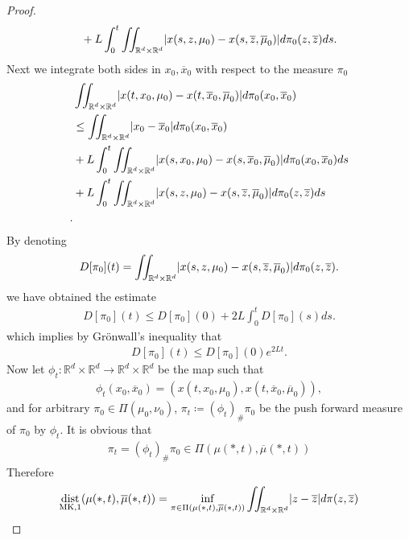\begin{proof}
\begin{alignat*}{3}
  &  &&+L \int_0^{t} \iint_{\mathbb{R}^{d} \times  \mathbb{R}^{d}  }  \lvert x(s,z,\mu_0) - x(s,\overline{z},\overline{\mu }_0  )\rvert  d\pi_0(z,\overline{z} ) ds
.\end{alignat*}
Next we integrate both sides in $x_{0},\overline{x}_0 $ with respect to the measure $\pi_0$
\begin{align*}
  &\iint_{\mathbb{R}^{d} \times  \mathbb{R}^{d}  }\lvert x(t,x_{0},\mu_0) - x(t,\overline{x}_0,\overline{\mu }_0  )\rvert d\pi_0(x_{0},\overline{x}_0 )\\
  &\le  \iint_{\mathbb{R}^{d}\times \mathbb{R}^{d}  }\lvert x_{0}-\overline{x}_0 \rvert d\pi_0(x_{0},\overline{x}_0 )\\
  &+ L \int_0^{t} \iint_{\mathbb{R}^{d} \times  \mathbb{R}^{d}  }   \lvert x(s,x_{0},\mu_0)-x(s,\overline{x}_0,\overline{\mu }_0  )\rvert d\pi_0(x_{0},\overline{x}_0 ) ds\\
  &+ L \int_0^{t} \iint_{\mathbb{R}^{d} \times  \mathbb{R}^{d}  }   \lvert x(s,z,\mu_0)-x(s,\overline{z},\overline{\mu }_0  )\rvert d\pi_0(z,\overline{z}  ) ds\\
.\end{align*}
By denoting 
\begin{align*}
  D[\pi_0](t) = \iint_{\mathbb{R}^{d}\times \mathbb{R}^{d}  }\lvert x(s,z,\mu_0)-x(s,\overline{z},\overline{\mu }_0  )\rvert d\pi_0(z,\overline{z} )
.\end{align*}
we have obtained the estimate 
\begin{align*}
  D[\pi_0](t) \le  D[\pi_0](0) + 2L\int_0^{t}D[\pi_{0}] (s) ds
.\end{align*}
which implies by Grönwall's inequality that 
\begin{align*}
  D[\pi_0](t) \le D[\pi_0](0)e^{2Lt} 
.\end{align*}
Now let $\phi_t : \mathbb{R}^{d} \times  \mathbb{R}^{d} \to  \mathbb{R}^{d} \times  \mathbb{R}^{d}    $ be the map such that 
\begin{align*}
  \phi_t(x_{0},\overline{x}_0 ) = (x(t,x_{0},\mu_0),x(t,\overline{x}_0,\overline{\mu }_0  )),
\end{align*}
and for arbitrary $\pi_0 \in  \Pi(\mu_0,\nu_0)$, $\pi_t \coloneqq  (\phi_t)_\# \pi_0$ be the push forward measure of $\pi_0$ by $\phi_t$.
It is obvious that 
\begin{align*}
  \pi_t = (\phi_t)_\# \pi_0 \in  \Pi(\mu(*,t),\overline{\mu }(*,t) )
\end{align*}
Therefore 
\begin{align*}
  \dist_{\text{MK},1}(\mu(*,t),\overline{\mu }(*,t) ) &= \inf_{\pi \in \Pi(\mu(*,t),\overline{\mu }(*,t) ) } \iint_{\mathbb{R}^{d} \times  \mathbb{R}^{d}  } \abs{z-\overline{z} } d\pi(z,\overline{z} )\\

\end{align*}
\end{proof}
